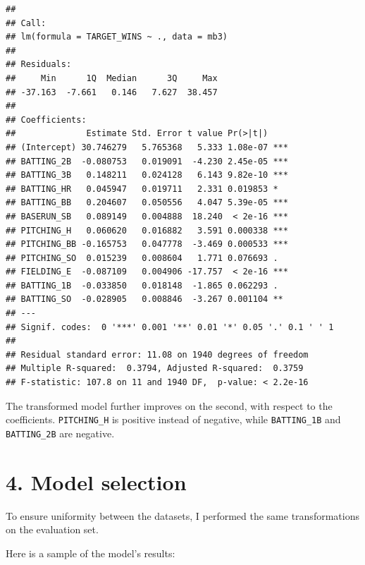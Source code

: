 \documentclass[]{article}
\begin{document}
\begin{verbatim}
## 
## Call:
## lm(formula = TARGET_WINS ~ ., data = mb3)
## 
## Residuals:
##     Min      1Q  Median      3Q     Max 
## -37.163  -7.661   0.146   7.627  38.457 
## 
## Coefficients:
##              Estimate Std. Error t value Pr(>|t|)    
## (Intercept) 30.746279   5.765368   5.333 1.08e-07 ***
## BATTING_2B  -0.080753   0.019091  -4.230 2.45e-05 ***
## BATTING_3B   0.148211   0.024128   6.143 9.82e-10 ***
## BATTING_HR   0.045947   0.019711   2.331 0.019853 *  
## BATTING_BB   0.204607   0.050556   4.047 5.39e-05 ***
## BASERUN_SB   0.089149   0.004888  18.240  < 2e-16 ***
## PITCHING_H   0.060620   0.016882   3.591 0.000338 ***
## PITCHING_BB -0.165753   0.047778  -3.469 0.000533 ***
## PITCHING_SO  0.015239   0.008604   1.771 0.076693 .  
## FIELDING_E  -0.087109   0.004906 -17.757  < 2e-16 ***
## BATTING_1B  -0.033850   0.018148  -1.865 0.062293 .  
## BATTING_SO  -0.028905   0.008846  -3.267 0.001104 ** 
## ---
## Signif. codes:  0 '***' 0.001 '**' 0.01 '*' 0.05 '.' 0.1 ' ' 1
## 
## Residual standard error: 11.08 on 1940 degrees of freedom
## Multiple R-squared:  0.3794, Adjusted R-squared:  0.3759 
## F-statistic: 107.8 on 11 and 1940 DF,  p-value: < 2.2e-16
\end{verbatim}

The transformed model further improves on the second, with respect to
the coefficients. \texttt{PITCHING\_H} is positive instead of negative,
while \texttt{BATTING\_1B} and \texttt{BATTING\_2B} are negative.

\section{4. Model selection}\label{model-selection}

To ensure uniformity between the datasets, I performed the same
transformations on the evaluation set.

Here is a sample of the model's results:

\begin{table}[H]
\centering{}

\end{table}
\end{document}
